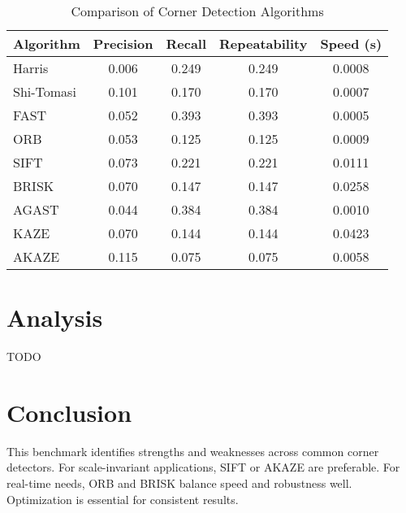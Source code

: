\documentclass[journal]{IEEEtran}
\begin{document}
\begin{table}[h]
    \centering
    \caption{Comparison of Corner Detection Algorithms}
    \label{tab:corner_detection_comparison}
    \begin{tabular}{lcccc}
    \toprule
    \textbf{Algorithm} & \textbf{Precision} & \textbf{Recall} & \textbf{Repeatability} & \textbf{Speed (s)} \\
    \midrule
    Harris & 0.006 & 0.249 & 0.249 & 0.0008 \\
    Shi-Tomasi & 0.101 & 0.170 & 0.170 & 0.0007 \\
    FAST & 0.052 & 0.393 & 0.393 & 0.0005 \\
    ORB & 0.053 & 0.125 & 0.125 & 0.0009 \\
    SIFT & 0.073 & 0.221 & 0.221 & 0.0111 \\
    BRISK & 0.070 & 0.147 & 0.147 & 0.0258 \\
    AGAST & 0.044 & 0.384 & 0.384 & 0.0010 \\
    KAZE & 0.070 & 0.144 & 0.144 & 0.0423 \\
    AKAZE & 0.115 & 0.075 & 0.075 & 0.0058 \\
    \bottomrule
    \end{tabular}
    \end{table}
    

\section{Analysis}
TODO

\section{Conclusion}
This benchmark identifies strengths and weaknesses across common corner detectors. For scale-invariant applications, SIFT or AKAZE are preferable. For real-time needs, ORB and BRISK balance speed and robustness well. Optimization is essential for consistent results.




\end{document}
